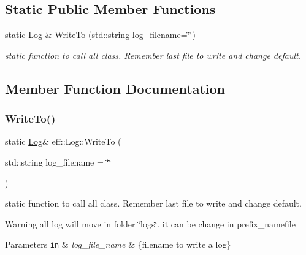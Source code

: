 \subsection*{Static Public Member Functions}
\begin{DoxyCompactItemize}
\item 
static \mbox{\hyperlink{classeff_1_1Log}{Log}} \& \mbox{\hyperlink{classeff_1_1Log_a58f5fc147f23b8a1a5b6c3eba70e8dcc}{Write\+To}} (std\+::string log\+\_\+filename=\char`\"{}\char`\"{})
\begin{DoxyCompactList}\small\item\em static function to call all class. Remember last file to write and change default. \end{DoxyCompactList}\end{DoxyCompactItemize}


\subsection{Member Function Documentation}
\mbox{\label{classeff_1_1Log_a58f5fc147f23b8a1a5b6c3eba70e8dcc}} 
\subsubsection{\texorpdfstring{Write\+To()}{WriteTo()}}
{\footnotesize\ttfamily static \mbox{\hyperlink{classeff_1_1Log}{Log}}\& eff\+::\+Log\+::\+Write\+To (\begin{DoxyParamCaption}\item[{std\+::string}]{log\+\_\+filename = {\ttfamily \char`\"{}\char`\"{}} }\end{DoxyParamCaption})\hspace{0.3cm}{\ttfamily [static]}}



static function to call all class. Remember last file to write and change default. 

\begin{DoxyWarning}{Warning}
all log will move in folder \char`\"{}logs\char`\"{}. it can be change in prefix\+\_\+namefile 
\end{DoxyWarning}

\begin{DoxyParams}[1]{Parameters}
\mbox{\tt in}  & {\em log\+\_\+file\+\_\+name} & \{filename to write a log\} \\
\hline
\end{DoxyParams}

